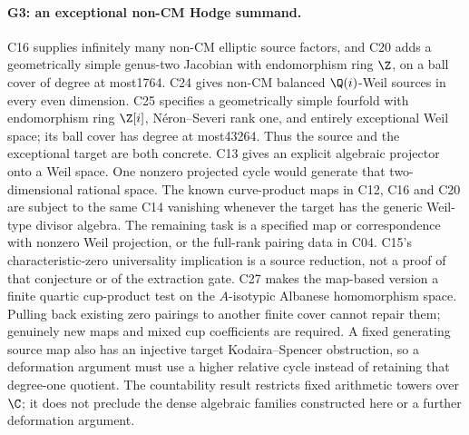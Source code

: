 \paragraph{G3: an exceptional non-CM Hodge summand.}
C16 supplies infinitely many non-CM elliptic source factors, and
C20 adds a geometrically simple genus-two Jacobian with
endomorphism ring $\Z$, on a ball cover of degree at most1764.
C24 gives non-CM balanced $\Q(i)$-Weil sources in every
even dimension. C25 specifies a geometrically simple fourfold
with endomorphism ring $\Z[i]$, N\'eron--Severi rank one,
and entirely exceptional Weil space; its ball cover has degree
at most43264. Thus the source and the exceptional target
are both concrete.
C13 gives
an explicit algebraic projector onto a Weil space. One nonzero
projected cycle would generate that two-dimensional rational space.
The known curve-product maps in C12, C16 and C20 are subject to the
same C14 vanishing whenever the target has the generic Weil-type
divisor algebra. The remaining task is a specified map or correspondence
with nonzero Weil projection, or the full-rank pairing data in C04.
C15's characteristic-zero universality implication is a source
reduction, not a proof of that conjecture or of the extraction gate.
C27 makes the map-based version a finite quartic cup-product
test on the $A$-isotypic Albanese homomorphism space. Pulling
back existing zero pairings to another finite cover cannot
repair them; genuinely new maps and mixed cup coefficients
are required. A fixed generating source map also has an
injective target Kodaira--Spencer obstruction, so a deformation
argument must use a higher relative cycle instead of retaining
that degree-one quotient.
The countability result restricts fixed arithmetic towers over
$\C$; it does not preclude the dense algebraic families constructed
here or a further deformation argument.

